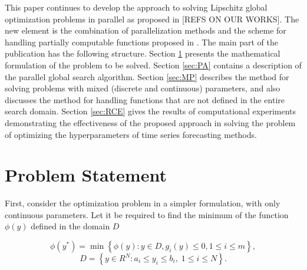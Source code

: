 \documentclass[runningheads]{llncs}
\begin{document}
This paper continues to develop the approach to solving Lipschitz global optimization problems in parallel as proposed in [REFS ON OUR WORKS]. The new element is the combination of parallelization methods and the scheme for handling partially computable functions proposed in \cite{Usova2024}. The main part of the publication has the following structure.  Section \ref{sec:PS} presents the mathematical formulation of the problem to be solved. Section \ref{sec:PA} contains a description of the parallel global search algorithm. Section \ref{sec:MP} describes the method for solving problems with mixed (discrete and continuous) parameters, and also discusses the method for handling functions that are not defined in the entire search domain. Section \ref{sec:RCE} gives the results of computational experiments demonstrating the effectiveness of the proposed approach in solving the problem of optimizing the hyperparameters of time series forecasting methods.

\section{Problem Statement}\label{sec:PS}
First, consider the optimization problem in a simpler formulation, with only continuous parameters. Let it be required to find the minimum of the function $\phi(y)$ defined in the domain $D$

\begin{equation} \label{problem}
\phi(y^*) = \min \left\{\phi(y): y \in D, g_i(y) \leq 0, 1 \leq i \leq m\right\}, 
\end{equation}
\[ D=\left\{ y \in R^N: a_i \leq y_i \leq b_i, \; 1 \leq i \leq N\right\}. \]
\end{document}

